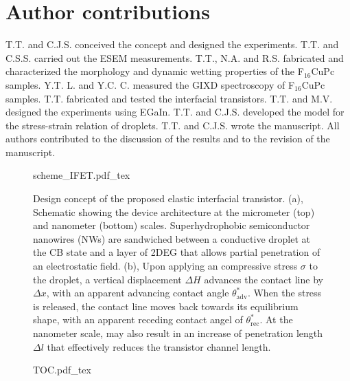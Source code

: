 \section{Author contributions}
\label{sec:small-contrib}
T.T. and C.J.S. conceived the concept and designed the
experiments. T.T. and C.S.S. carried out the ESEM
measurements. T.T., N.A. and R.S. fabricated and characterized the
morphology and dynamic wetting properties of the F\(_{\text{16}}\)CuPc
samples. Y.T. L. and Y.C. C. measured the GIXD spectroscopy of
F\(_{\text{16}}\)CuPc samples. T.T. fabricated and tested the interfacial
transistors. T.T. and M.V. designed the experiments using
EGaIn. T.T. and C.J.S. developed the model for the stress-strain
relation of droplets. T.T. and C.J.S. wrote the manuscript. All
authors contributed to the discussion of the results and to the
revision of the manuscript.



% 

\newpage{}

\begin{figure}[htbp]
  \centering
  {scheme_IFET.pdf_tex}
\caption{\label{fig:small-main-1}
Design concept of the proposed elastic interfacial transistor. (a), Schematic showing the device architecture at the micrometer (top) and nanometer (bottom) scales. Superhydrophobic semiconductor nanowires (NWs) are sandwiched between a conductive droplet at the CB state and a layer of 2DEG that allows partial penetration of an electrostatic field. (b), Upon applying an compressive stress \(\sigma\) to the droplet, a vertical displacement \(\Delta H\) advances the contact line by \(\Delta x\), with an apparent advancing contact angle \(\theta_{\mathrm{adv}}^{*}\). When the stress is released, the contact line moves back towards its equilibrium shape, with an apparent receding contact angel of \(\theta_{\mathrm{rec}}^{*}\). At the nanometer scale,  may also result in an increase of penetration length \(\Delta l\) that effectively reduces the transistor channel length.}
\end{figure}

\begin{figure}[htbp]
  \centering
  {TOC.pdf_tex}
  \caption{\label{fig:small-toc}
}
\end{figure}


